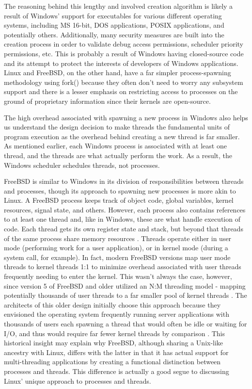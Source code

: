 \documentclass[onecolumn, draftclsnofoot,10pt, compsoc]{IEEEtran}
\begin{document}
The reasoning behind this lengthy and involved creation algorithm is likely a result of Windows' support for executables for various different operating systems, including MS 16-bit, DOS applications, POSIX applications, and potentially others. Additionally, many security measures are built into the creation process in order to validate debug access permissions, scheduler priority permissions, etc. This is probably a result of Windows having closed-source code and its attempt to protect the interests of developers of Windows applications. Linux and FreeBSD, on the other hand, have a far simpler process-spawning methodology using fork() because they often don't need to worry any subsystem support and there is a lesser emphasis on restricting access to processes on the ground of proprietary information since their kernels are open-source.

The high overhead associated with spawning a new process in Windows also helps us understand the design decision to make threads the fundamental units of program execution as the overhead behind creating a new thread is far smaller.  As mentioned earlier, each Windows process is associated with at least one thread, and the threads are what actually perform the work. As a result, the Windows scheduler schedules threads, not processes. 

FreeBSD is similar to Windows in its division of responsibilities between threads and processes, though its approach to spawning new processes is more akin to Linux. A FreeBSD process keeps track of object code, global variables, kernel resources, signal state, and others. However, each process also contains references to at least one thread and, like in Windows, these are what handle execution of code. Each thread gets its own register state and stack, but beyond that threads of the same process share memory resources \cite{FreeBSD}. Threads operate either in user mode (performing work for a user application), or in kernel mode (during a system call, for example). In fact, modern FreeBSD versions map user mode threads to kernel threads 1:1 to minimize overhead associated with user threads frequently needing to enter the kernel. This wasn't always the case, however, since version 5 of FreeBSD and older utilized an N:M threading model - mapping potentially thousands of user threads to a far smaller pool of kernel threads \cite{FreeBSD}. The architects of this older design initially choose this approach because they envisioned the operating system frequently running server applications with thousands of users each spawning a thread that would often be idle or waiting for I/O, and thus would require far fewer kernel threads by comparison \cite{FreeBSD}. This historical insight may explain why FreeBSD, although sharing a Unix-like ancestry with Linux, differs with the latter in that it has actual support for multi-threading applications by creating a functional distinction between processes and threads. This difference is actually a good segue to discussing Linux' unique approach to processes and threads.
\end{document}
